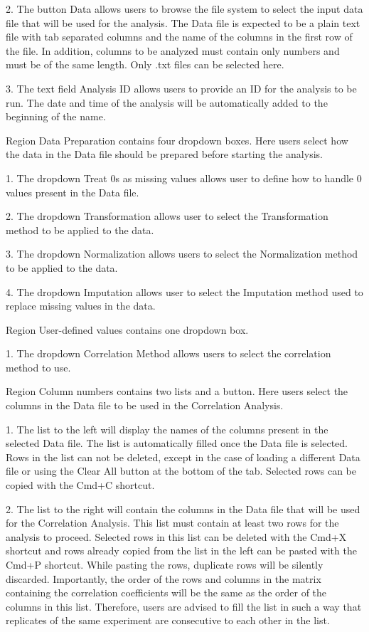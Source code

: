 \num{2}. The button Data allows users to browse the file system to select the input
data file that will be used for the analysis. The Data file is expected to be a
plain text file with tab separated columns and the name of the columns in the first
row of the file. In addition, columns to be analyzed must contain only numbers and
must be of the same length. Only .txt files can be selected here.

\num{3}. The text field Analysis ID allows users to provide an ID for the analysis
to be run. The date and time of the analysis will be automatically added to the
beginning of the name.

Region Data Preparation contains four dropdown boxes. Here users select how the data
in the Data file should be prepared before starting the analysis.

\num{1}. The dropdown Treat \num{0}s as missing values allows user to define how
to handle \num{0} values present in the Data file.

\num{2}. The dropdown Transformation allows user to select the Transformation method
to be applied to the data.

\num{3}. The dropdown Normalization allows users to select the Normalization method
to be applied to the data.

\num{4}. The dropdown Imputation allows user to select the Imputation method used
to replace missing values in the data.

Region User-defined values contains one dropdown box.

\num{1}. The dropdown Correlation Method allows users to select the correlation method
to use.

Region Column numbers contains two lists and a button. Here users select the columns
in the Data file to be used in the Correlation Analysis.

\num{1}. The list to the left will display the names of the columns present in the
selected Data file. The list is automatically filled once the Data file is selected.
Rows in the list can not be deleted, except in the case of loading a different Data
file or using the Clear All button at the bottom of the tab. Selected rows can be
copied with the Cmd+C shortcut.

\num{2}. The list to the right will contain the columns in the Data file that will
be used for the Correlation Analysis. This list must contain at least two rows for
the analysis to proceed. Selected rows in this list can be deleted with the Cmd+X
shortcut and rows already copied from the list in the left can be pasted with the
Cmd+P shortcut. While pasting the rows, duplicate rows will be silently discarded.
Importantly, the order of the rows and columns in the matrix containing the correlation
coefficients will be the same as the order of the columns in this list. Therefore,
users are advised to fill the list in such a way that replicates of the same experiment
are consecutive to each other in the list.

